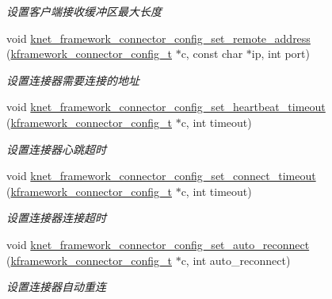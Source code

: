 \begin{DoxyCompactItemize}
\begin{DoxyCompactList}\small\item\em 设置客户端接收缓冲区最大长度 \end{DoxyCompactList}\item 
void \hyperlink{a00111_gae677441ee9bcc61da7c7728ce3ae773e_gae677441ee9bcc61da7c7728ce3ae773e}{knet\+\_\+framework\+\_\+connector\+\_\+config\+\_\+set\+\_\+remote\+\_\+address} (\hyperlink{a00054_a44d3033eba5a4fd784a741700a7a2521_a44d3033eba5a4fd784a741700a7a2521}{kframework\+\_\+connector\+\_\+config\+\_\+t} $\ast$c, const char $\ast$ip, int port)
\begin{DoxyCompactList}\small\item\em 设置连接器需要连接的地址 \end{DoxyCompactList}\item 
void \hyperlink{a00111_ga186f2fb032c5b2350e990c63b5aa628e_ga186f2fb032c5b2350e990c63b5aa628e}{knet\+\_\+framework\+\_\+connector\+\_\+config\+\_\+set\+\_\+heartbeat\+\_\+timeout} (\hyperlink{a00054_a44d3033eba5a4fd784a741700a7a2521_a44d3033eba5a4fd784a741700a7a2521}{kframework\+\_\+connector\+\_\+config\+\_\+t} $\ast$c, int timeout)
\begin{DoxyCompactList}\small\item\em 设置连接器心跳超时 \end{DoxyCompactList}\item 
void \hyperlink{a00111_gacf0d08bb6f135c12326d30acad7456f1_gacf0d08bb6f135c12326d30acad7456f1}{knet\+\_\+framework\+\_\+connector\+\_\+config\+\_\+set\+\_\+connect\+\_\+timeout} (\hyperlink{a00054_a44d3033eba5a4fd784a741700a7a2521_a44d3033eba5a4fd784a741700a7a2521}{kframework\+\_\+connector\+\_\+config\+\_\+t} $\ast$c, int timeout)
\begin{DoxyCompactList}\small\item\em 设置连接器连接超时 \end{DoxyCompactList}\item 
void \hyperlink{a00111_ga984a212938eb7d5b79fae88c5eeb1644_ga984a212938eb7d5b79fae88c5eeb1644}{knet\+\_\+framework\+\_\+connector\+\_\+config\+\_\+set\+\_\+auto\+\_\+reconnect} (\hyperlink{a00054_a44d3033eba5a4fd784a741700a7a2521_a44d3033eba5a4fd784a741700a7a2521}{kframework\+\_\+connector\+\_\+config\+\_\+t} $\ast$c, int auto\+\_\+reconnect)
\begin{DoxyCompactList}\small\item\em 设置连接器自动重连 \end{DoxyCompactList}\item 

\end{DoxyCompactItemize}
